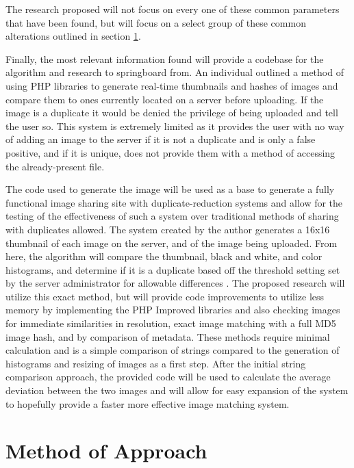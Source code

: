 \documentclass[11pt]{article}
\begin{document}
The research proposed will not focus on every one of these common parameters that have been found, but will focus on a select group of these common alterations outlined in section \ref{sec:method}.

Finally, the most relevant information found will provide a codebase for the algorithm and research to springboard from. An individual outlined a method of using PHP libraries to generate real-time thumbnails and hashes of images and compare them to ones currently located on a server before uploading. If the image is a duplicate it would be denied the privilege of being uploaded and tell the user so. This system is extremely limited as it provides the user with no way of adding an image to the server if it is not a duplicate and is only a false positive, and if it is unique, does not provide them with a method of accessing the already-present file.

The code used to generate the image will be used as a base to generate a fully functional image sharing site with duplicate-reduction systems and allow for the testing of the effectiveness of such a system over traditional methods of sharing with duplicates allowed. The system created by the author generates a 16x16 thumbnail of each image on the server, and of the image being uploaded. From here, the algorithm will compare the thumbnail, black and white, and color histograms, and determine if it is a duplicate based off the threshold setting set by the server administrator for allowable differences \cite{catpa:gdcode}. The proposed research will utilize this exact method, but will provide code improvements to utilize less memory by implementing the PHP Improved libraries and also checking images for immediate similarities in resolution, exact image matching with a full MD5 image hash, and by comparison of metadata. These methods require minimal calculation and is a simple comparison of strings compared to the generation of histograms and resizing of images as a first step. After the initial string comparison approach, the provided code will be used to calculate the average deviation between the two images and will allow for easy expansion of the system to hopefully provide a faster more effective image matching system.

\vspace*{-.2in}
\section{Method of Approach}
\label{sec:method}
\vspace*{-.1in}
\end{document}
